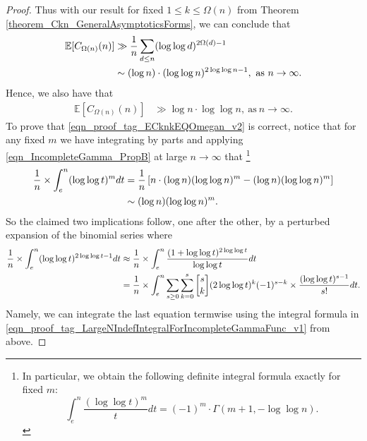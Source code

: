 \documentclass[11pt,reqno,a4letter]{article}
\numberwithin{figure}{section}
\numberwithin{table}{section}
\newcommand{\gkpSI}[2]{\ensuremath{\genfrac{\lbrack}{\rbrack}{0pt}{}{#1}{#2}}}
\newcommand{\cf}{\textit{cf.\ }}
\theoremstyle{plain}
\numberwithin{theorem}{section}
\theoremstyle{definition}
\begin{document}
\begin{proof}
Thus with our result for fixed $1 \leq k \leq \Omega(n)$ from 
Theorem \ref{theorem_Ckn_GeneralAsymptoticsForms}, 
we can conclude that 
\begin{align} 
\notag 
\mathbb{E}[C_{\Omega(n)}(n)] & \gg \frac{1}{n} \sum_{d \leq n} (\log\log d)^{2\Omega(d)-1} \\ 
\label{eqn_proof_tag_ECknkEQOmegan_v2} 
     & \sim (\log n) \cdot (\log\log n)^{2\log\log n - 1}, \mathrm{\ as\ } n \rightarrow \infty. 
\end{align} 
Hence, we also have that 
\begin{align*} 
\mathbb{E}[C_{\Omega(n)}(n)] & \gg \log n \cdot \log\log n, \mathrm{\ as\ } n \rightarrow \infty. 
\end{align*} 
To prove that \eqref{eqn_proof_tag_ECknkEQOmegan_v2} is correct, notice that 
for any fixed $m$ we have integrating by parts and applying \eqref{eqn_IncompleteGamma_PropB} at 
large $n \rightarrow \infty$ that \footnote{ 
     In particular, we obtain the following definite integral formula exactly 
     for fixed $m$: 
     \[
     \int_{e}^{n} \frac{(\log\log t)^{m}}{t} dt = (-1)^m \cdot \Gamma(m+1, -\log\log n). 
     \]
}
\begin{align} 
\label{eqn_proof_tag_LargeNIndefIntegralForIncompleteGammaFunc_v1} 
\frac{1}{n} \times \int_{e}^{n} (\log\log t)^m dt & = \frac{1}{n}\left[ 
     n \cdot (\log n) (\log\log n)^m - (\log n) (\log\log n)^m\right] \\ 
\notag 
     & \sim (\log n) (\log\log n)^m. 
\end{align} 
So the claimed two implications follow, one after the other, by a 
perturbed expansion of the binomial series where \cite[\cf \S 6]{GKP} 
\begin{align*} 
\frac{1}{n} \times \int_{e}^{n} (\log\log t)^{2\log\log t - 1} dt & \approx 
     \frac{1}{n} \times \int_{e}^{n} \frac{(1 + \log\log t)^{2\log\log t}}{\log\log t} dt \\ 
     & = \frac{1}{n} \times \int_{e}^{n} 
     \sum_{s \geq 0} \sum_{k=0}^{s} \gkpSI{s}{k} (2\log\log t)^{k} (-1)^{s-k} \times 
     \frac{(\log\log t)^{s-1}}{s!} dt. 
\end{align*} 
Namely, we can integrate the last equation termwise using the 
integral formula in \eqref{eqn_proof_tag_LargeNIndefIntegralForIncompleteGammaFunc_v1} 
from above. 
\end{proof} 
\end{document}
